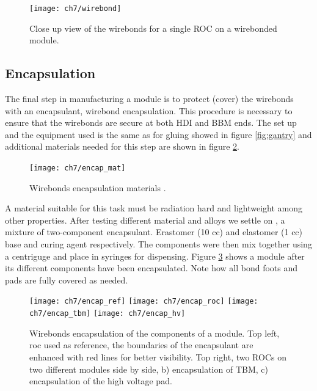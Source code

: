\begin{figure}[!h]
  \centering
  \texttt{[image: ch7/wirebond]}
  \caption[Wirebonded module]{Close up view of the wirebonds for a single ROC on a wirebonded module.}\label{fig:wirebond}
\end{figure}



\subsection{Encapsulation}
The final step in manufacturing a module is to protect (cover) the wirebonds with an encapsulant, wirebond encapsulation. This procedure is necessary to ensure that the wirebonds are secure at both HDI and BBM ends. The set up and the equipment used is the same as for gluing showed in figure \ref{fig:gantry} and additional materials needed for this step are shown in figure \ref{fig:encapmate}. 
 
\begin{figure}[!h]
  \centering
  \texttt{[image: ch7/encap\_mat]}
  \caption[Encapsulation materials]{Wirebonds encapsulation materials \cite{ph1_sop}.}\label{fig:encapmate}
\end{figure}

A material suitable for this task must be radiation hard and lightweight among other properties. After testing different material and alloys we settle on , a mixture of two-component encapsulant. Erastomer (10 cc) and elastomer (1 cc) base and curing agent respectively. The components were then mix together using a centriguge and place in syringes for dispensing. Figure \ref{fig:encap} shows a module after its different components have been encapsulated. Note how all bond foots and pads are fully covered as needed. 

\begin{figure}[!h]
  \centering
  \texttt{[image: ch7/encap\_ref]}
  \texttt{[image: ch7/encap\_roc]}
  \texttt{[image: ch7/encap\_tbm]}
  \texttt{[image: ch7/encap\_hv]}
  \caption[Encapsulation results]{Wirebonds encapsulation of the components of a module. Top left, roc used as reference, the boundaries of the encapsulant are enhanced with red lines for better visibility. Top right, two ROCs on two different modules side by side, b) encapsulation of TBM, c) encapsulation of the high voltage pad.}\label{fig:encap}
\end{figure}

